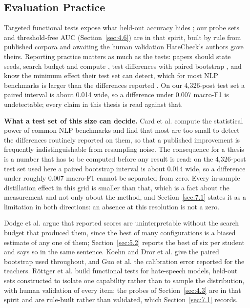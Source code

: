 \subsection{Evaluation Practice}
\label{sec:2.4}
Targeted functional tests expose what held-out accuracy hides \cite{rottger2021hatecheck}; our probe
sets and threshold-free AUC (Section~\ref{sec:4.6}) are in that spirit, built by rule from published
corpora and awaiting the human validation HateCheck's authors gave theirs. Reporting practice
matters as much as the tests: papers should state seeds, search budget and compute
\cite{dodge2019show}, test differences with paired bootstrap \cite{koehn2004statistical,
dror2018hitchhiker}, and know the minimum effect their test set can detect, which for most NLP
benchmarks is larger than the differences reported \cite{card2020power}. On our 4,326-post test set
a paired interval is about 0.014 wide, so a difference under 0.007 macro-F1 is undetectable; every
claim in this thesis is read against that.

\textbf{What a test set of this size can decide.} Card et al. \cite{card2020power} compute the statistical power of common NLP benchmarks and find that
most are too small to detect the differences routinely reported on them, so that a published improvement
is frequently indistinguishable from resampling noise. The consequence for a thesis is a number that has
to be computed before any result is read: on the 4,326-post test set used here a paired bootstrap
interval is about 0.014 wide, so a difference under roughly 0.007 macro-F1 cannot be separated from
zero. Every in-sample distillation effect in this grid is smaller than that, which is a fact about the
measurement and not only about the method, and Section~\ref{sec:7.1} states it as a limitation in both
directions: an absence at this resolution is not a zero.

Dodge et al. \cite{dodge2019show} argue that reported scores are uninterpretable without the search
budget that produced them, since the best of many configurations is a biased estimate of any one of them;
Section~\ref{sec:5.2} reports the best of six per student and says so in the same sentence. Koehn
\cite{koehn2004statistical} and Dror et al. \cite{dror2018hitchhiker} give the paired bootstrap used
throughout, and Guo et al. \cite{guo2017calibration} the calibration error reported for the teachers.
Röttger et al. \cite{rottger2021hatecheck} build functional tests for hate-speech models, held-out sets
constructed to isolate one capability rather than to sample the distribution, with human validation of
every item; the probes of Section~\ref{sec:4.3} are in that spirit and are rule-built rather than
validated, which Section~\ref{sec:7.1} records.

